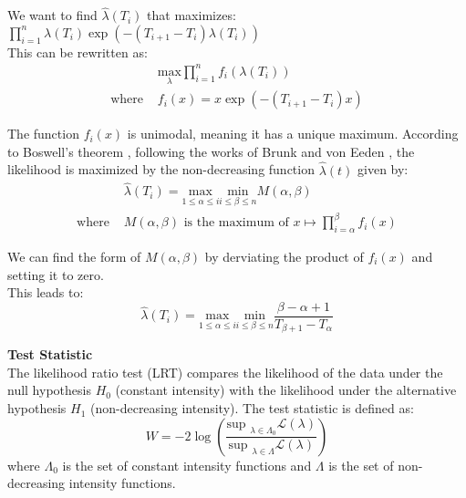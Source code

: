 \documentclass{journalstyle}
\begin{document}
\noindent We want to find $\hat{\lambda}(T_i)$ that maximizes: \\
$\prod_{i=1}^{n} \lambda(T_i) \exp(-(T_{i+1} - T_i) \lambda(T_i))$ \\

This can be rewritten as: \\
\begin{equation*}
    \begin{split}
        &\underset{\lambda}{\text{max}} \prod_{i=1}^{n} f_i(\lambda(T_i)) \\
        \text{where } &f_i(x) = x \exp(-(T_{i+1} - T_i) x)
    \end{split}
    \label{eq:boswell_optimization_problem}
\end{equation*}

The function $f_i(x)$ is unimodal, meaning it has a unique maximum.
According to Boswell's theorem \cite{Boswell1966}, following the works of Brunk and von Eeden \cite{VanEeden1956}, the likelihood is maximized by the non-decreasing function $\hat{\lambda}(t)$ given by: \\
\begin{equation*}
    \begin{split}
        &\hat{\lambda}(T_i) = \underset{1 \leq \alpha \leq i}{\text{max}} \underset{i \leq \beta \leq n}{\text{min}} M(\alpha, \beta) \\
        \text{where } &M(\alpha, \beta) \text{ is the maximum of } x \mapsto \prod_{i=\alpha}^{\beta} f_i(x)
    \end{split}
    \label{eq:boswell_optimal_lambda}
\end{equation*}

We can find the form of $M(\alpha, \beta)$ by derviating the product of $f_i(x)$ and setting it to zero. \\
This leads to: \\
\begin{equation}
    \hat{\lambda}(T_i) = \underset{1 \leq \alpha \leq i}{\text{max}} \underset{i \leq \beta \leq n}{\text{min}} \frac{\beta - \alpha + 1}{T_{\beta + 1} - T_{\alpha}}
    \label{eq:boswell_optimal_lambda_formula}
\end{equation}

\noindent\textbf{Test Statistic} \\
The likelihood ratio test (LRT) compares the likelihood of the data under the null hypothesis $H_0$ (constant intensity) with the likelihood under the alternative hypothesis $H_1$ (non-decreasing intensity).
The test statistic is defined as: \\
$$
W = -2 \log \left( \frac{\text{sup }_{\lambda \in \Lambda_0} \mathcal{L}(\lambda)}{\text{sup }_{\lambda \in \Lambda} \mathcal{L}(\lambda)} \right)
$$
where $\Lambda_0$ is the set of constant intensity functions and $\Lambda$ is the set of non-decreasing intensity functions. \\
\end{document}

